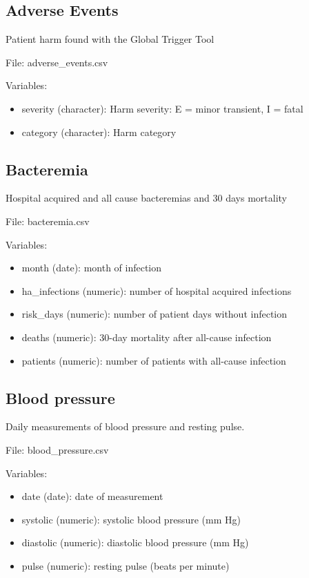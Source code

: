\documentclass[
]{book}
\providecommand{\tightlist}{%
  \setlength{\itemsep}{0pt}\setlength{\parskip}{0pt}}
\begin{document}
\subsection*{Adverse Events}\label{adverse-events}

Patient harm found with the Global Trigger Tool

File: adverse\_events.csv

Variables:

\begin{itemize}
\tightlist
\item
  severity (character): Harm severity: E = minor transient, I = fatal
\item
  category (character): Harm category
\end{itemize}

\subsection*{Bacteremia}\label{bacteremia}

Hospital acquired and all cause bacteremias and 30 days mortality

File: bacteremia.csv

Variables:

\begin{itemize}
\tightlist
\item
  month (date): month of infection
\item
  ha\_infections (numeric): number of hospital acquired infections
\item
  risk\_days (numeric): number of patient days without infection
\item
  deaths (numeric): 30-day mortality after all-cause infection
\item
  patients (numeric): number of patients with all-cause infection
\end{itemize}

\subsection*{Blood pressure}\label{blood-pressure}

Daily measurements of blood pressure and resting pulse.

File: blood\_pressure.csv

Variables:

\begin{itemize}
\tightlist
\item
  date (date): date of measurement
\item
  systolic (numeric): systolic blood pressure (mm Hg)
\item
  diastolic (numeric): diastolic blood pressure (mm Hg)
\item
  pulse (numeric): resting pulse (beats per minute)
\end{itemize}
\end{document}
